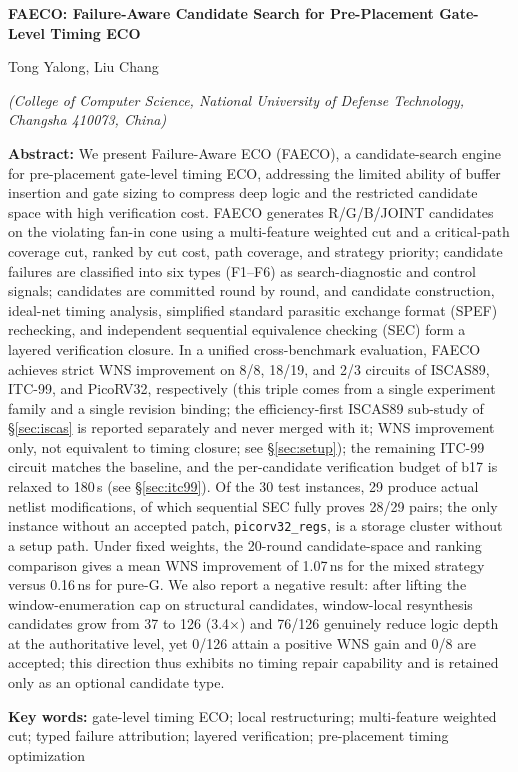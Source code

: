 \documentclass[twocolumn,10pt,fontset=windows]{ctexart}
\begin{document}
\vspace{2pt}
\begin{center}
{\bfseries\fontsize{12.5}{16}\selectfont FAECO: Failure-Aware Candidate Search for Pre-Placement Gate-Level Timing ECO}\par
\vspace{3pt}
{\normalsize Tong Yalong, Liu Chang\par}
\vspace{3pt}
{\small \itshape (College of Computer Science, National University of Defense Technology, Changsha 410073, China)}\par
\vspace{4pt}
\end{center}
\begin{flushleft}
  {\bfseries Abstract:} {\small We present Failure-Aware ECO (FAECO), a candidate-search engine for pre-placement gate-level timing ECO, addressing the limited ability of buffer insertion and gate sizing to compress deep logic and the restricted candidate space with high verification cost. FAECO generates R/G/B/JOINT candidates on the violating fan-in cone using a multi-feature weighted cut and a critical-path coverage cut, ranked by cut cost, path coverage, and strategy priority; candidate failures are classified into six types (F1--F6) as search-diagnostic and control signals; candidates are committed round by round, and candidate construction, ideal-net timing analysis, simplified standard parasitic exchange format (SPEF) rechecking, and independent sequential equivalence checking (SEC) form a layered verification closure. In a unified cross-benchmark evaluation, FAECO achieves strict WNS improvement on 8/8, 18/19, and 2/3 circuits of ISCAS89, ITC-99, and PicoRV32, respectively (this triple comes from a single experiment family and a single revision binding; the efficiency-first ISCAS89 sub-study of \S\ref{sec:iscas} is reported separately and never merged with it; WNS improvement only, not equivalent to timing closure; see \S\ref{sec:setup}); the remaining ITC-99 circuit matches the baseline, and the per-candidate verification budget of b17 is relaxed to 180\,s (see \S\ref{sec:itc99}). Of the 30 test instances, 29 produce actual netlist modifications, of which sequential SEC fully proves 28/29 pairs; the only instance without an accepted patch, \texttt{picorv32\_regs}, is a storage cluster without a setup path. Under fixed weights, the 20-round candidate-space and ranking comparison gives a mean WNS improvement of 1.07\,ns for the mixed strategy versus 0.16\,ns for pure-G. We also report a negative result: after lifting the window-enumeration cap on structural candidates, window-local resynthesis candidates grow from 37 to 126 (3.4$\times$) and 76/126 genuinely reduce logic depth at the authoritative level, yet 0/126 attain a positive WNS gain and 0/8 are accepted; this direction thus exhibits no timing repair capability and is retained only as an optional candidate type.}\par
\vspace{3pt}
{\bfseries Key words:} {\small gate-level timing ECO; local restructuring; multi-feature weighted cut; typed failure attribution; layered verification; pre-placement timing optimization}\par
\end{flushleft}
\end{document}
